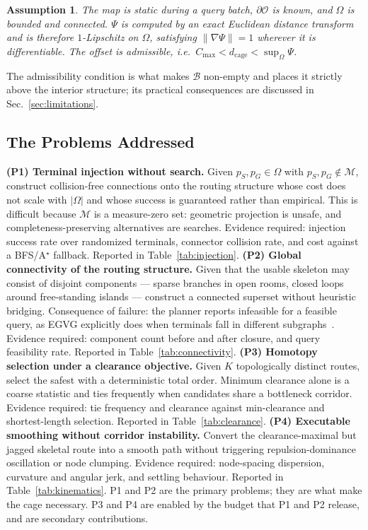 \documentclass[conference]{IEEEtran}
\newtheorem{assumption}{Assumption}
\begin{document}
\begin{assumption}
\label{asm:setting}
The map is static during a query batch, $\partial\mathcal{O}$ is known, and $\Omega$ is bounded and connected. $\Psi$ is computed by an exact Euclidean distance transform~\cite{felzenszwalb2012} and is therefore $1$-Lipschitz on $\Omega$, satisfying $\|\nabla\Psi\|=1$ wherever it is differentiable. The offset is admissible, i.e.\ $C_{\max}<d_{\mathrm{cage}}<\sup_{\Omega}\Psi$.
\end{assumption}
The admissibility condition is what makes $\mathcal{B}$ non-empty and places it strictly above the interior structure; its practical consequences are discussed in Sec.~\ref{sec:limitations}.
\subsection{The Problems Addressed}
\textbf{(P1) Terminal injection without search.} Given $p_S,p_G\in\Omega$ with $p_S,p_G\notin\mathcal{M}$, construct collision-free connections onto the routing structure whose cost does not scale with $|\Omega|$ and whose success is guaranteed rather than empirical. This is difficult because $\mathcal{M}$ is a measure-zero set: geometric projection is unsafe, and completeness-preserving alternatives are searches. Evidence required: injection success rate over randomized terminals, connector collision rate, and cost against a BFS/A$^\star$ fallback. Reported in Table~\ref{tab:injection}.
\textbf{(P2) Global connectivity of the routing structure.} Given that the usable skeleton may consist of disjoint components --- sparse branches in open rooms, closed loops around free-standing islands --- construct a connected superset without heuristic bridging. Consequence of failure: the planner reports infeasible for a feasible query, as EGVG explicitly does when terminals fall in different subgraphs~\cite{qi2025egvg}. Evidence required: component count before and after closure, and query feasibility rate. Reported in Table~\ref{tab:connectivity}.
\textbf{(P3) Homotopy selection under a clearance objective.} Given $K$ topologically distinct routes, select the safest with a deterministic total order. Minimum clearance alone is a coarse statistic and ties frequently when candidates share a bottleneck corridor. Evidence required: tie frequency and clearance against min-clearance and shortest-length selection. Reported in Table~\ref{tab:clearance}.
\textbf{(P4) Executable smoothing without corridor instability.} Convert the clearance-maximal but jagged skeletal route into a smooth path without triggering repulsion-dominance oscillation or node clumping. Evidence required: node-spacing dispersion, curvature and angular jerk, and settling behaviour. Reported in Table~\ref{tab:kinematics}.
P1 and P2 are the primary problems; they are what make the cage necessary. P3 and P4 are enabled by the budget that P1 and P2 release, and are secondary contributions.
\end{document}

